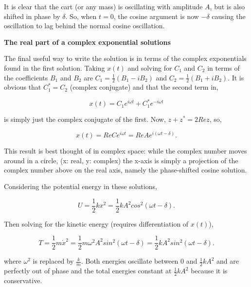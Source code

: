 It is clear that the cart (or any mass) is oscillating with amplitude $A$, but is also shifted in phase by $\delta$. So, when $t=0$, the cosine argument is now $-\delta$ causing the oscillation to lag behind the normal cosine oscillation.


{\vspace{0.35cm} \bfseries \noindent The real part of a complex exponential solutions}

The final useful way to write the solution is in terms of the complex exponentials found in the first solution. Taking $x(t)$ and solving for $C_1$ and $C_2$ in terms of the coefficients $B_1$ and $B_2$ are $C_1 = \frac{1}{2}(B_1 - i B_2)$ and $C_2 = \frac{1}{2}(B_1 + i B_2)$. It is obvious that $C_1^* = C_2$ (complex conjugate) and that the second term in,

\begin{equation*}
    x(t) = C_1 e^{i \omega t} + C_1^* e^{-i \omega t}
\end{equation*}

\noindent is simply just the complex conjugate of the first. Now, $z + z^* = 2 Re z$, so,

\begin{equation*}
    x(t) = Re C e^{i \omega t} = Re A e^{i(\omega t - \delta)}.
\end{equation*}

This result is best thought of in complex space: while the complex number moves around in a circle, (x: real, y: complex) the x-axis is simply a projection of the complex number above on the real axis, namely the phase-shifted cosine solution.

\vspace{0.35cm}

Considering the potential energy in these solutions, 

\begin{equation*}
    U = \frac{1}{2}kx^2 = \frac{1}{2}k A^2 cos^2(\omega t - \delta).
\end{equation*}

Then solving for the kinetic energy (requires differentiation of $x(t)$), 

\begin{equation*}
    T = \frac{1}{2}m \dot{x}^2 = \frac{1}{2}m \omega^2 A^2 sin^2(\omega t - \delta) = \frac{1}{2}k A^2 sin^2(\omega t - \delta).
\end{equation*}

\noindent where $\omega^2$ is replaced by $\frac{k}{m}$. Both energies oscillate between $0$ and $\frac{1}{2}k A^2$ and are perfectly out of phase and the total energies constant at $\frac{1}{2}k A^2$ because it is conservative.
